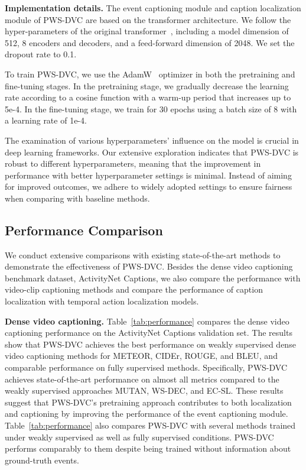 \textbf{Implementation details.}
The event captioning module and caption localization module of PWS-DVC are based on the transformer architecture.
We follow the hyper-parameters of the original transformer~\cite{Vaswani2017-sc}, including a model dimension of 512, 8 encoders and decoders, and a feed-forward dimension of 2048.
We set the dropout rate to 0.1.

To train PWS-DVC, we use the AdamW~\cite{Loshchilov2017-sm} optimizer in both the pretraining and fine-tuning stages.
In the pretraining stage, we gradually decrease the learning rate according to a cosine function with a warm-up period that increases up to 5e-4.
In the fine-tuning stage, we train for 30 epochs using a batch size of 8 with a learning rate of 1e-4.

The examination of various hyperparameters' influence on the model is crucial in deep learning frameworks.
Our extensive exploration indicates that PWS-DVC is robust to different hyperparameters, meaning that the improvement in performance with better hyperparameter settings is minimal.
Instead of aiming for improved outcomes, we adhere to widely adopted settings to ensure fairness when comparing with baseline methods.


\subsection{Performance Comparison}
We conduct extensive comparisons with existing state-of-the-art methods to demonstrate the effectiveness of PWS-DVC. Besides the dense video captioning benchmark dataset, ActivityNet Captions, we also compare the performance with video-clip captioning methods and compare the performance of caption localization with temporal action localization models.

\textbf{Dense video captioning.}
Table~\ref{tab:performance} compares the dense video captioning performance on the ActivityNet Captions validation set.
The results show that PWS-DVC achieves the best performance on weakly supervised dense video captioning methods for METEOR, CIDEr, ROUGE, and BLEU, and comparable performance on fully supervised methods.
Specifically, PWS-DVC achieves state-of-the-art performance on almost all metrics compared to the weakly supervised approaches MUTAN, WS-DEC, and EC-SL.
These results suggest that PWS-DVC's pretraining approach contributes to both localization and captioning by improving the performance of the event captioning module.
Table~\ref{tab:performance} also compares PWS-DVC with several methods trained under weakly supervised as well as fully supervised conditions.
PWS-DVC performs comparably to them despite being trained without information about ground-truth events.


